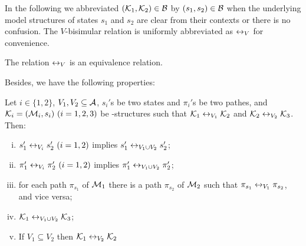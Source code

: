 \documentclass{article}
\begin{document}
 In the following we abbreviated $({\cal K}_1,{\cal K}_2)\in \cal B$
 by $(s_1,s_2)\in \cal B$
 when the underlying model structures of states $s_1$ and $s_2$ are clear from their contexts
 or there is no confusion.
  The $V$-bisimular relation is uniformly abbreviated as $\leftrightarrow_V$ for convenience.%
\begin{lemma}\label{lem:equive}
  The relation $\leftrightarrow_V$ is an equivalence relation.
\end{lemma}

Besides, we have the following properties:
\begin{proposition}\label{div}
Let $i\in \{1,2\}$, $V_1,V_2\subseteq\cal A$, $s_i'$s be two states and
  $\pi_i'$s be two pathes,
and ${\cal K}_i=({\cal M}_i,s_i)~(i=1,2,3)$ be \MPK-structures
 such that
${\cal K}_1\leftrightarrow_{V_1}{\cal K}_2$ and ${\cal K}_2\leftrightarrow_{V_2}{\cal K}_3$.
 Then:
 \begin{enumerate}[(i)]
   \item $s_1'\leftrightarrow_{V_i}s_2'~(i=1,2)$ implies $s_1'\leftrightarrow_{V_1\cup V_2}s_2'$;
   \item $\pi_1'\leftrightarrow_{V_i}\pi_2'~(i=1,2)$ implies $\pi_1'\leftrightarrow_{V_1\cup V_2}\pi_2'$;
   \item for each path $\pi_{s_1}$ of ${\cal M}_1$ there is a path $\pi_{s_2}$  of ${\cal M}_2$ such that $\pi_{s_1} \leftrightarrow_{V_1} \pi_{s_2}$, and vice versa;
   \item ${\cal K}_1\leftrightarrow_{V_1\cup V_2}{\cal K}_3$;
   \item If $V_1 \subseteq V_2$ then ${\cal K}_1 \leftrightarrow_{V_2} {\cal K}_2$
 \end{enumerate}
\end{proposition}
\end{document}
